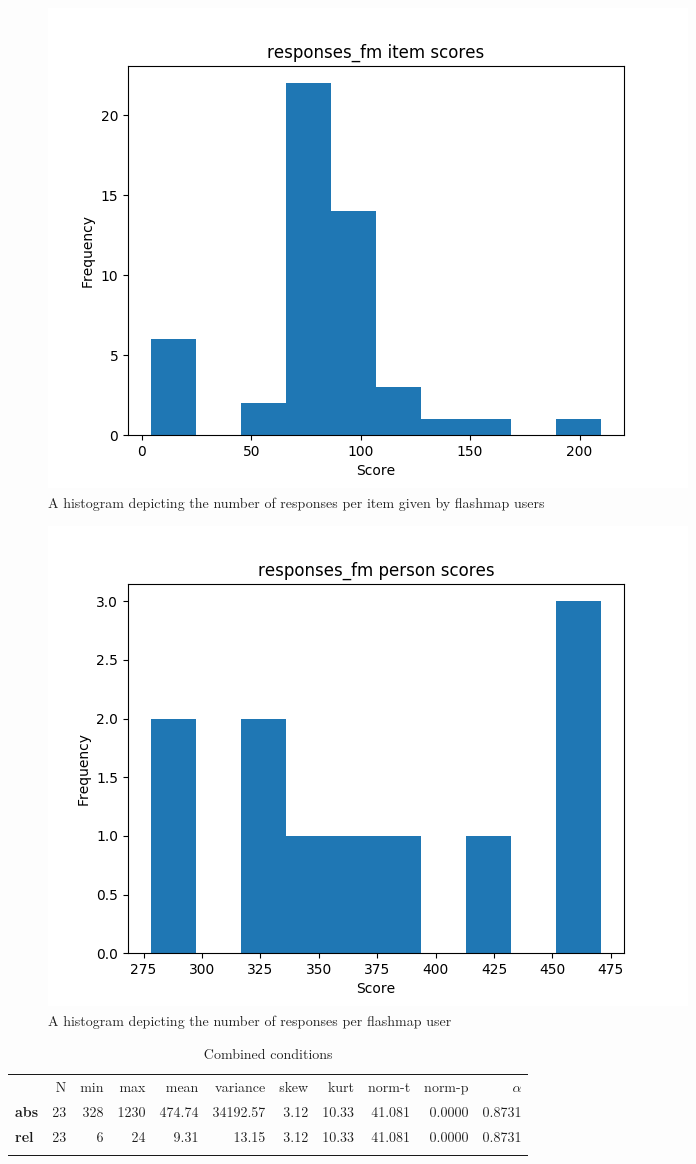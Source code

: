 \begin{figure}
\includegraphics[width=\textwidth]{img/responses_fm_diff.png}
    \caption{A histogram depicting the number of responses per item given by flashmap users}
    \label{fig:responses_fm_diff}
\end{figure}
\begin{figure}
    \includegraphics[width=\textwidth]{img/responses_fm_abil.png}
    \caption{A histogram depicting the number of responses per flashmap user}
    \label{fig:responses_fm_abil}
\end{figure}

\begin{longtable}[c]{@{}lrrrrrrrrrr@{}}
\caption{Combined conditions}
\endfirsthead
\toprule\addlinespace
& N & min & max & mean & variance & skew & kurt & norm-t &
norm-p & $\alpha$
\\\addlinespace
\midrule
\textbf{abs} & 23 & 328 & 1230 & 474.74 & 34192.57 & 3.12 & 10.33 &
41.081 & 0.0000 & 0.8731
\\\addlinespace
\textbf{rel} & 23 & 6 & 24 & 9.31 & 13.15 & 3.12 & 10.33 & 41.081 &
0.0000 & 0.8731
\\\addlinespace
\bottomrule
    \label{tab:responses_gen}
\end{longtable}

